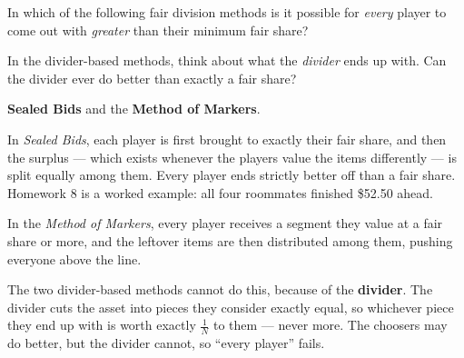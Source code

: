 \documentclass[12pt]{ximera}
\begin{document}
\begin{problem}
In which of the following fair division methods is it possible for \emph{every} player
to come out with \emph{greater} than their minimum fair share?

\begin{selectAll}
\end{selectAll}

\begin{hint}
In the divider-based methods, think about what the \emph{divider} ends up with. Can the
divider ever do better than exactly a fair share?
\end{hint}

\begin{solution}
\textbf{Sealed Bids} and the \textbf{Method of Markers}.

In \emph{Sealed Bids}, each player is first brought to exactly their fair share, and
then the surplus --- which exists whenever the players value the items differently ---
is split equally among them. Every player ends strictly better off than a fair share.
Homework 8 is a worked example: all four roommates finished \$52.50 ahead.

In the \emph{Method of Markers}, every player receives a segment they value at a fair
share or more, and the leftover items are then distributed among them, pushing
everyone above the line.

The two divider-based methods cannot do this, because of the \textbf{divider}. The
divider cuts the asset into pieces they consider exactly equal, so whichever piece they
end up with is worth exactly $\frac1N$ to them --- never more. The choosers may do
better, but the divider cannot, so ``every player'' fails.
\end{solution}
\end{problem}
\end{document}
